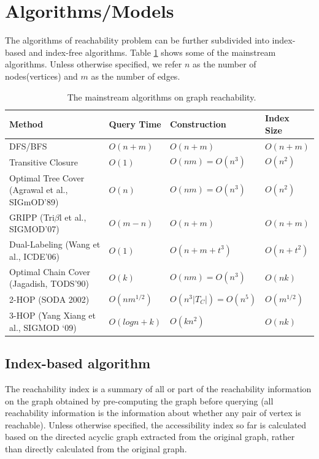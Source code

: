 \documentclass[11pt]{article}
\begin{document}
\section{Algorithms/Models}
The algorithms of reachability problem can be further subdivided into index-based and index-free algorithms. Table \ref{table:algorithms}\cite{ref1} shows some of the mainstream algorithms.
Unless otherwise specified, we refer $n$ as the number of nodes(vertices) and $m$ as the number of edges.
\begin{table}[H]
	\centering
	\caption{\newline \ The mainstream algorithms on graph reachability.}
	\begin{tabular}{l|l|l|l}
		\toprule
		Method & Query Time & Construction & Index Size \\ \midrule
		DFS/BFS&  $O(n+m)$   &$O(n+m)$      &$O(n+m)$    \\ \midrule
		Transitive Closure&   $O(1)$      & $O(nm)=O(n^3)$     & $O(n^2)$ \\ \midrule
		Optimal Tree Cover
		(Agrawal et al., SIGmOD’89)& $O(n)$  &$O(nm)=O(n^3)$     &$O(n^2)$            \\ \midrule
		GRIPP
		(Tri$\beta$l et al., SIGMOD’07)&  $O(m-n)$&$O(n+m)$ &$O(n+m)$ \\ \midrule
		Dual-Labeling
		(Wang et al., ICDE’06)& $O(1)$ &$O(n+m+t^3)$&$O(n+t^2)$ \\ \midrule
		Optimal Chain Cover 
		(Jagadish, TODS’90)&$O(k)$ &$O(nm)=O(n^3)$&$O(nk)$  \\ \midrule
		2-HOP (SODA 2002) &$O(nm^{1/2})$&$O(n^3|T_C|)=O(n^5)$&$O(m^{1/2})$ \\ \midrule
		3-HOP 
		(Yang Xiang et al., SIGMOD ‘09)&$O(log n +k)$  &$O(kn^2)$&$O(nk)$\\ \bottomrule
	\end{tabular}
	\label{table:algorithms}
\end{table}
\subsection{Index-based algorithm}
The reachability index is a summary of all or part of the reachability information on the graph obtained by pre-computing the graph before querying (all reachability information is the information about whether any pair of vertex is reachable). Unless otherwise specified, the accessibility index so far is calculated based on the directed acyclic graph extracted from the original graph, rather than directly calculated from the original graph.
\end{document}
